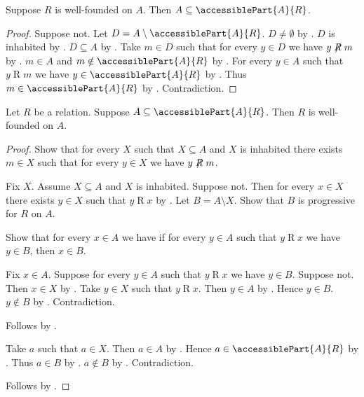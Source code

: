 \begin{proposition}\label{well_founded_on_implies_accessible}
    Suppose $R$ is well-founded on $A$.
    Then $A\subseteq\accessiblePart{A}{R}$.
\end{proposition}
\begin{proof}
    Suppose not.
    Let $D=A\setminus\accessiblePart{A}{R}$.
    $D\neq\emptyset$ by .
    $D$ is inhabited by .
    $D\subseteq A$ by .
    Take $m\in D$ such that for every $y\in D$ we have $y\not\mathrel{R}m$
        by .
    $m\in A$ and $m\notin\accessiblePart{A}{R}$ by .
    For every $y\in A$ such that $y\mathrel{R}m$
        we have $y\in\accessiblePart{A}{R}$ by .
    Thus $m\in\accessiblePart{A}{R}$ by .
    Contradiction.
\end{proof}

\begin{proposition}\label{accessible_implies_well_founded_on}
    Let $R$ be a relation.
    Suppose $A\subseteq\accessiblePart{A}{R}$.
    Then $R$ is well-founded on $A$.
\end{proposition}
\begin{proof}
    Show that for every $X$ such that $X\subseteq A$ and $X$ is inhabited
        there exists $m\in X$ such that for every $y\in X$
            we have $y\not\mathrel{R}m$.
    \begin{subproof}
        Fix $X$.
        Assume $X\subseteq A$ and $X$ is inhabited.
        Suppose not.
        Then for every $x\in X$ there exists $y\in X$ such that $y\mathrel{R}x$
            by \auto.
        Let $B=A\setminus X$.
        Show that $B$ is progressive for $R$ on $A$.
        \begin{subproof}
            Show that for every $x\in A$ we have
                if for every $y\in A$ such that $y\mathrel{R}x$ we have $y\in B$,
                then $x\in B$.
            \begin{subproof}
                Fix $x\in A$.
                Suppose for every $y\in A$ such that $y\mathrel{R}x$ we have $y\in B$.
                Suppose not.
                Then $x\in X$ by .
                Take $y\in X$ such that $y\mathrel{R}x$.
                Then $y\in A$ by .
                Hence $y\in B$.
                $y\notin B$ by .
                Contradiction.
            \end{subproof}
            Follows by .
        \end{subproof}
        Take $a$ such that $a\in X$.
        Then $a\in A$ by .
        Hence $a\in\accessiblePart{A}{R}$ by .
        Thus $a\in B$ by .
        $a\notin B$ by .
        Contradiction.
    \end{subproof}
    Follows by .
\end{proof}

